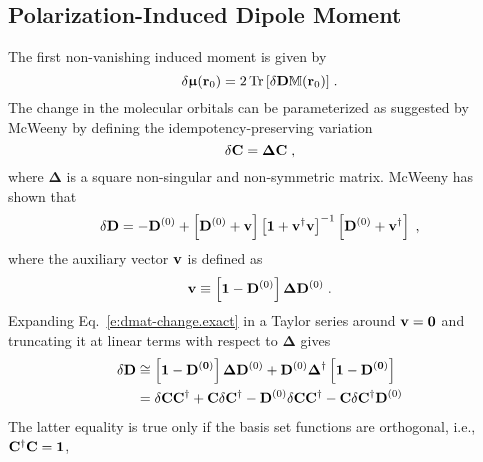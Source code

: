 \documentclass[aip,graphicx]{revtex4-1}
\newcommand{\BM}[1]{\bm{#1}}
\DeclareMathOperator{\Tr}{Tr}
\begin{document}
\subsection{Polarization\hyp{}Induced Dipole Moment}

The first non\hyp{}vanishing induced moment is given by
%
\begin{equation} \label{e:dmu-exact}
 \delta {\BM{\upmu}}({\bf r}_0) = 
     2 \Tr{ 
         \left[ 
              \delta {\bf D} {\mathbb{M}({\bf r}_0)}
         \right] } \;.
\end{equation}
%
The change in the molecular orbitals can be parameterized as suggested by McWeeny\cite{McWeeny.RevModPhys.1960}
by defining the idempotency\hyp{}preserving variation
%
\begin{equation}
 \delta {\bf C} = {\BM\Delta} {\bf C} \;,
\end{equation}
%
where $\BM\Delta$ is a square non\hyp{}singular and non\hyp{}symmetric matrix.
McWeeny has shown that
%
\begin{equation} \label{e:dmat-change.exact}
 \delta {\bf D} = -{\bf D}^{(0)} + \left[ {\bf D}^{(0)} + {\bf v} \right]
                                   \left[ {\bf 1} + {\bf v}^\dagger{\bf v} \right]^{-1}
                                   \left[ {\bf D}^{(0)} + {\bf v}^\dagger \right] \;,
\end{equation}
%
where the auxiliary vector ${\bf v}$ is defined as
%
\begin{equation}
 {\bf v} \equiv \left[ {\bf 1} - {\bf D}^{(0)} \right] {\BM\Delta} {\bf D}^{(0)}  \;.
\end{equation}
%
Expanding Eq.~\eqref{e:dmat-change.exact} in a Taylor series around ${\bf v}={\bf 0}$ and
truncating it at linear terms with respect to ${\BM\Delta}$ gives
%
\begin{subequations} 
 \begin{align}
 \delta {\bf D} &\cong \left[ \bf{1} - {\bf D}^{(0)} \right] {\BM\Delta} {\bf D}^{(0)} + 
                        {\bf D}^{(0)} {\BM\Delta}^\dagger \left[ \bf{1} - {\bf D}^{(0)} \right]  
 \label{e:dD-1} \\  &= 
  \delta {\bf C}  {\bf C}^\dagger + {\bf C}\delta {\bf C}^\dagger
           - {\bf D}^{(0)} \delta {\bf C}  {\bf C}^\dagger - {\bf C}\delta {\bf C}^\dagger {\bf D}^{(0)} 
 \label{e:dD-2}
 \end{align}
\end{subequations}
%
The latter equality is true only if the basis set functions are orthogonal, i.e., ${{\bf C}^\dagger}{\bf C}={\bf 1}$,
\end{document}
